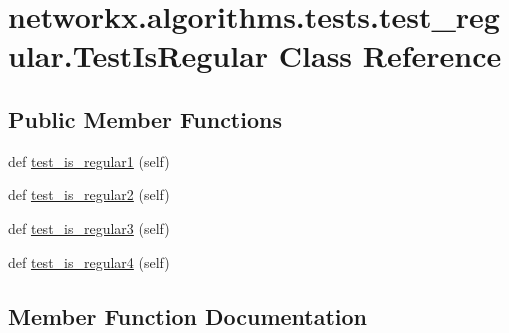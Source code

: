 \hypertarget{classnetworkx_1_1algorithms_1_1tests_1_1test__regular_1_1TestIsRegular}{}\section{networkx.\+algorithms.\+tests.\+test\+\_\+regular.\+Test\+Is\+Regular Class Reference}
\label{classnetworkx_1_1algorithms_1_1tests_1_1test__regular_1_1TestIsRegular}
\subsection*{Public Member Functions}
\begin{DoxyCompactItemize}
\item 
def \hyperlink{classnetworkx_1_1algorithms_1_1tests_1_1test__regular_1_1TestIsRegular_accd6ac1e5517d7529b2bf16524cad4e0}{test\+\_\+is\+\_\+regular1} (self)
\item 
def \hyperlink{classnetworkx_1_1algorithms_1_1tests_1_1test__regular_1_1TestIsRegular_adfed69302e4cdfc34821982d14e0cc50}{test\+\_\+is\+\_\+regular2} (self)
\item 
def \hyperlink{classnetworkx_1_1algorithms_1_1tests_1_1test__regular_1_1TestIsRegular_ac19c9c7a0f182567ace45b781e7dbcca}{test\+\_\+is\+\_\+regular3} (self)
\item 
def \hyperlink{classnetworkx_1_1algorithms_1_1tests_1_1test__regular_1_1TestIsRegular_affabbed7331d894001c45d8e9b2f9804}{test\+\_\+is\+\_\+regular4} (self)
\end{DoxyCompactItemize}


\subsection{Member Function Documentation}
\mbox{\label{classnetworkx_1_1algorithms_1_1tests_1_1test__regular_1_1TestIsRegular_accd6ac1e5517d7529b2bf16524cad4e0}} 
